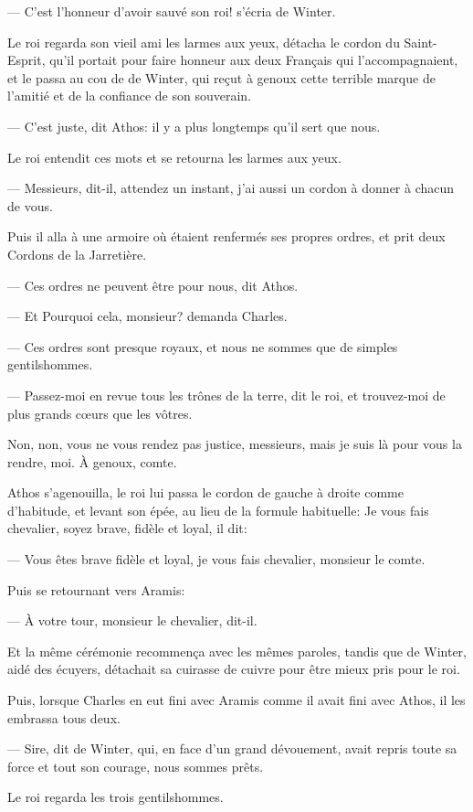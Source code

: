 — C'est l'honneur d'avoir sauvé son roi! s'écria de Winter.

Le roi regarda son vieil ami les larmes aux yeux, détacha le cordon du Saint-Esprit, qu'il portait pour faire honneur aux deux Français qui l'accompagnaient, et le passa au cou de de Winter, qui reçut à genoux cette terrible marque de l'amitié et de la confiance de son souverain.

— C'est juste, dit Athos: il y a plus longtemps qu'il sert que nous.

Le roi entendit ces mots et se retourna les larmes aux yeux.

— Messieurs, dit-il, attendez un instant, j'ai aussi un cordon à donner à chacun de vous.

Puis il alla à une armoire où étaient renfermés ses propres ordres, et prit deux Cordons de la Jarretière.

— Ces ordres ne peuvent être pour nous, dit Athos.

— Et Pourquoi cela, monsieur? demanda Charles.

— Ces ordres sont presque royaux, et nous ne sommes que de simples gentilshommes.

— Passez-moi en revue tous les trônes de la terre, dit le roi, et trouvez-moi de plus grands cœurs que les vôtres.

Non, non, vous ne vous rendez pas justice, messieurs, mais je suis là pour vous la rendre, moi. À genoux, comte.

Athos s'agenouilla, le roi lui passa le cordon de gauche à droite comme d'habitude, et levant son épée, au lieu de la formule habituelle: Je vous fais chevalier, soyez brave, fidèle et loyal, il dit:

— Vous êtes brave fidèle et loyal, je vous fais chevalier, monsieur le comte.

Puis se retournant vers Aramis:

— À votre tour, monsieur le chevalier, dit-il.

Et la même cérémonie recommença avec les mêmes paroles, tandis que de Winter, aidé des écuyers, détachait sa cuirasse de cuivre pour être mieux pris pour le roi.

Puis, lorsque Charles en eut fini avec Aramis comme il avait fini avec Athos, il les embrassa tous deux.

— Sire, dit de Winter, qui, en face d'un grand dévouement, avait repris toute sa force et tout son courage, nous sommes prêts.

Le roi regarda les trois gentilshommes.

